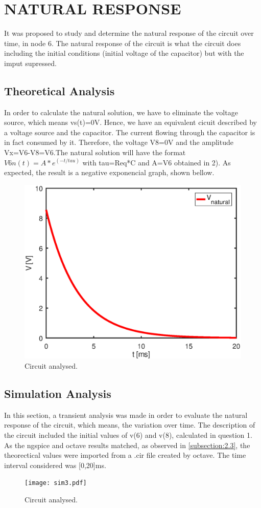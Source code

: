 \section{NATURAL RESPONSE}
It was proposed to study and determine the natural response of the circuit over time, in node 6. The natural response of the circuit is what the circuit does including the initial conditions (initial voltage of the capacitor) but with the imput supressed. 

\subsection{Theoretical Analysis}


In order to calculate the natural solution, we have to eliminate the voltage source, which means vs(t)=0V. Hence, we have an equivalent cicuit described by a voltage source and the capacitor. The current flowing through the capacitor is in fact consumed by it. Therefore, the voltage V8=0V and the amplitude Vx=V6-V8=V6.The natural solution will have the format $V{6n}(t)=A*e^{(-t/tau)}$ with tau=Req*C and A=V6 obtained in 2). As expected, the result is a negative exponencial graph, shown bellow.

\begin{figure}[ht] \centering
\includegraphics[width=0.5\linewidth]{natural.eps}
\caption{Circuit analysed.}
\label{fig:sim3}
\end{figure}


\subsection{Simulation Analysis}
In this section, a transient analysis was made in order to evaluate the natural response of the circuit, which means, the variation over time. The description of the circuit included the initial values of v(6) and v(8), calculated in question 1. As the ngspice and octave results matched, as observed in \ref{subsection:2.3}, the theorectical values were imported from a .cir file created by octave.
The time interval considered was [0,20]ms.
\begin{figure}[h] \centering
\texttt{[image: sim3.pdf]}
\caption{Circuit analysed.}
\label{fig:sim3}
\end{figure}
\newpage
